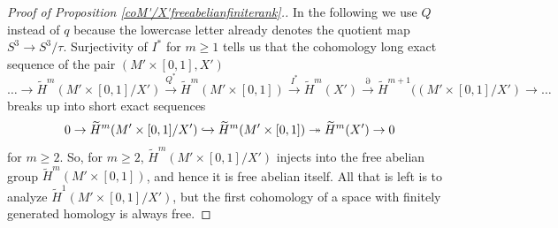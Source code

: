 \documentclass[10pt,a4paper]{amsart}
\begin{document}
\begin{proof}[Proof of Proposition \ref{coM'/X'freeabelianfiniterank}.]
In the following we use $Q$ instead of $q$ because the lowercase letter already denotes the quotient map $S^3\to S^3/\tau$. Surjectivity of $I^*$ for $m\ge 1$ tells us that the cohomology long exact sequence of the pair $(M'\times[0,1],X')$
\[\hdots \to\widetilde{H}^m(M'\times[0,1]/X')\xrightarrow{Q^*}\widetilde{H}^m(M'\times[0,1])\xrightarrow{I^*}\widetilde{H}^m(X')\xrightarrow{\partial}\widetilde{H}^{m+1}((M'\times[0,1]/X')\to\hdots\]
breaks up into short exact sequences
\[
0\to\widetilde{H}^m(M'\times[0,1]/X')\xhookrightarrow{}\widetilde{H}^m(M'\times[0,1])\twoheadrightarrow\widetilde{H}^m(X')\to 0
\]
for $m\ge 2$. So, for $m\ge 2$, $\widetilde{H}^m(M'\times[0,1]/X')$ injects into the free abelian group $\widetilde{H}^m(M'\times[0,1])$, and hence it is free abelian itself. All that is left is to analyze $\widetilde{H}^1(M'\times[0,1]/X')$, but the first cohomology of a space with finitely generated homology is always free.
\end{proof}
\end{document}
